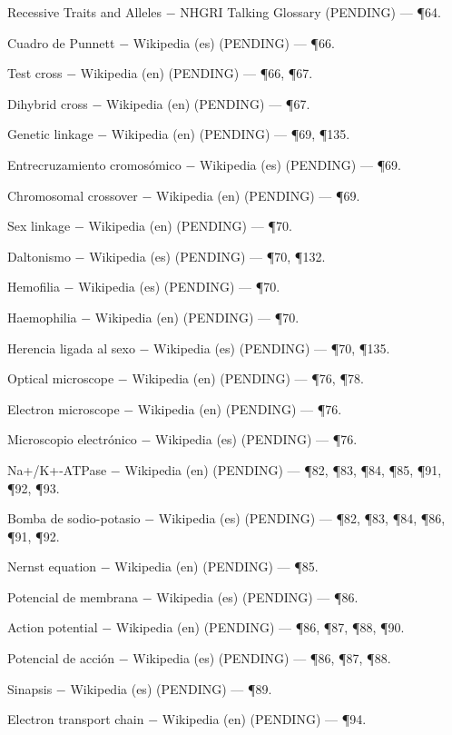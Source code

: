 \documentclass{book}
\begin{document}
\noindent Recessive Traits and Alleles \(-\) NHGRI Talking Glossary (PENDING) --- \P64.

\noindent Cuadro de Punnett \(-\) Wikipedia (es) (PENDING) --- \P66.

\noindent Test cross \(-\) Wikipedia (en) (PENDING) --- \P66, \P67.

\noindent Dihybrid cross \(-\) Wikipedia (en) (PENDING) --- \P67.

\noindent Genetic linkage \(-\) Wikipedia (en) (PENDING) --- \P69, \P135.

\noindent Entrecruzamiento cromosómico \(-\) Wikipedia (es) (PENDING) --- \P69.

\noindent Chromosomal crossover \(-\) Wikipedia (en) (PENDING) --- \P69.

\noindent Sex linkage \(-\) Wikipedia (en) (PENDING) --- \P70.

\noindent Daltonismo \(-\) Wikipedia (es) (PENDING) --- \P70, \P132.

\noindent Hemofilia \(-\) Wikipedia (es) (PENDING) --- \P70.

\noindent Haemophilia \(-\) Wikipedia (en) (PENDING) --- \P70.

\noindent Herencia ligada al sexo \(-\) Wikipedia (es) (PENDING) --- \P70, \P135.

\noindent Optical microscope \(-\) Wikipedia (en) (PENDING) --- \P76, \P78.

\noindent Electron microscope \(-\) Wikipedia (en) (PENDING) --- \P76.

\noindent Microscopio electrónico \(-\) Wikipedia (es) (PENDING) --- \P76.

\noindent Na+/K+-ATPase \(-\) Wikipedia (en) (PENDING) --- \P82, \P83, \P84, \P85, \P91, \P92, \P93.

\noindent Bomba de sodio-potasio \(-\) Wikipedia (es) (PENDING) --- \P82, \P83, \P84, \P86, \P91, \P92.

\noindent Nernst equation \(-\) Wikipedia (en) (PENDING) --- \P85.

\noindent Potencial de membrana \(-\) Wikipedia (es) (PENDING) --- \P86.

\noindent Action potential \(-\) Wikipedia (en) (PENDING) --- \P86, \P87, \P88, \P90.

\noindent Potencial de acción \(-\) Wikipedia (es) (PENDING) --- \P86, \P87, \P88.

\noindent Sinapsis \(-\) Wikipedia (es) (PENDING) --- \P89.

\noindent Electron transport chain \(-\) Wikipedia (en) (PENDING) --- \P94.
\end{document}
